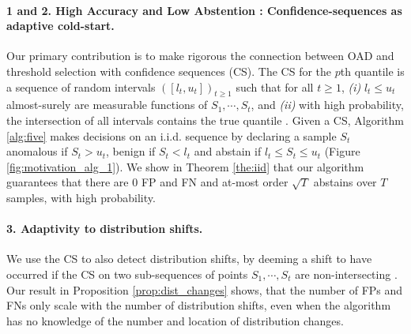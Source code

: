 \vspace{-0.5em}
\paragraph{1 and 2. High Accuracy and Low Abstention : Confidence-sequences as adaptive cold-start.} Our primary contribution is to make rigorous the connection between OAD and threshold selection with confidence sequences (CS). The CS for the $p$th quantile is a sequence of random intervals $([l_t, u_t])_{t \geq 1}$ such that for all $t \geq 1$, {\em(i)} $l_t \leq u_t$ almost-surely are measurable functions of $S_1, \cdots, S_t$, and {\em(ii)} with high probability, the intersection of all intervals contains the true quantile \cite{howard2022sequential}. 
Given a CS, Algorithm \ref{alg:five}  makes decisions on an i.i.d. sequence by declaring a sample $S_t$ anomalous if $S_t > u_t$, benign if $S_t < l_t$ and abstain if $l_t \leq S_t \leq u_t$ (Figure \ref{fig:motivation_alg_1}). We show in Theorem \ref{the:iid} that our algorithm guarantees that there are $0$ FP and FN and at-most order $\sqrt{T}$  abstains over $T$ samples, with high probability. 

\vspace{-0.5em}
\paragraph{3. Adaptivity to distribution shifts.} We use the CS to also detect distribution shifts, by deeming a shift to have occurred if the CS on two sub-sequences of points $S_1, \cdots, S_t$ are non-intersecting \cite{shekhar2023sequential, sankararaman2023online}. Our result in Proposition \ref{prop:dist_changes} shows, that the number of FPs and FNs only scale with the number of distribution shifts, even when the algorithm has no knowledge of the number and location of distribution changes.

\vspace{-0.5em}
